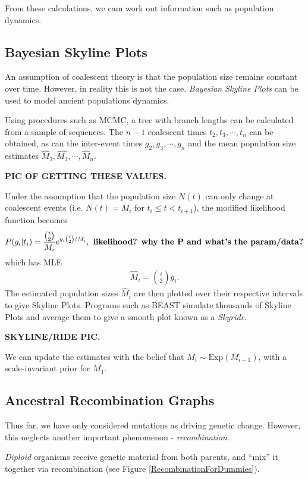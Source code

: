 \documentclass[12pt]{article}
\begin{document}
From these calculations, we cam work out information such as population dynamics.
 
\subsection{Bayesian Skyline Plots}\label{ssec:skyline}
An assumption of coalescent theory is that the population size remains constant over time. However, in reality this is not the case. \emph{Bayesian Skyline Plots} can be used to model ancient populations dynamics.

Using procedures such as MCMC, a tree with branch lengths can be calculated from a sample of sequences. The $n-1$ coalescent times $t_2, t_3, \cdots, t_n$ can be obtained, as can the inter-event times $g_2, g_3, \cdots, g_n$ and the mean population size estimates $\widehat{M}_2, \widehat{M_3}, \cdots, \widehat{M}_n$.

\textbf{PIC OF GETTING THESE VALUES.}

Under the assumption that the population size $N(t)$ can only change at coalescent events (i.e. $N(t)=M_i$ for $t_i\le t<t_{i+1}$), the modified likelihood function becomes
\begin{eqnarray}
  P(g_i|t_i)=\frac{{i\choose 2}}{M_i}e^{g_i{i\choose 2}/M_i}, \text{\textbf{ likelihood? why the P and what's the param/data?}}
\end{eqnarray}
which has MLE
\begin{eqnarray}
  \widehat{M}_i={i\choose 2}g_i.
\end{eqnarray}
The estimated population sizes $ \widehat{M}_i$ are then plotted over their respective intervals to give Skyline Plots. Programs such as BEAST simulate thousands of Skyline Plots and average them to give a smooth plot known as a \emph{Skyride}.

\textbf{SKYLINE/RIDE PIC.}

We can update the estimates with the belief that $M_i\sim\text{Exp}(M_{i-1})$, with a scale-invariant prior for $M_1$.

\subsection{Ancestral Recombination Graphs}\label{ssec:ARGs}
Thus far, we have only considered mutations as driving genetic change. However, this neglects another important phenomenon - \emph{recombination}.

\emph{Diploid} organisms receive genetic material from both parents, and ``mix'' it together via recombination (see Figure \ref{RecombinationForDummies}).
\end{document}
